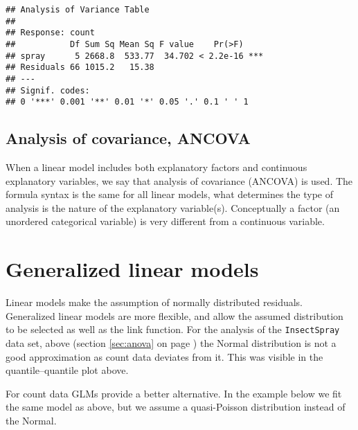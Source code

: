\documentclass[paper=a4,headsepline,BCOR=12mm,twoside,open=right,%
titlepage,headings=small,fontsize=10pt,index=totoc,bibliography=totoc,%
captions=tableheading,captions=nooneline]{scrbook}\usepackage{knitr}
\begin{document}
\begin{knitrout}\footnotesize
{}\color{fgcolor}\begin{kframe}
\begin{alltt}
\end{alltt}
\begin{verbatim}
## Analysis of Variance Table
## 
## Response: count
##           Df Sum Sq Mean Sq F value    Pr(>F)    
## spray      5 2668.8  533.77  34.702 < 2.2e-16 ***
## Residuals 66 1015.2   15.38                      
## ---
## Signif. codes:  
## 0 '***' 0.001 '**' 0.01 '*' 0.05 '.' 0.1 ' ' 1
\end{verbatim}
\end{kframe}
\end{knitrout}

\subsection{Analysis of covariance, ANCOVA}

When a linear model includes both explanatory factors and continuous explanatory variables, we say that analysis of covariance (ANCOVA) is used. The formula syntax is the same for all linear models, what determines the type of analysis is the nature of the explanatory variable(s). Conceptually a factor (an unordered categorical variable) is very different from a continuous variable.

\section{Generalized linear models}

Linear models make the assumption of normally distributed residuals. Generalized linear models are more flexible, and allow the assumed distribution to be selected as well as the link function.
For the analysis of the \texttt{InsectSpray} data set, above (section \ref{sec:anova} on page \pageref{sec:anova}) the Normal distribution is not a good approximation as count data deviates from it. This was visible in the quantile--quantile plot above.

For count data GLMs provide a better alternative. In the example below we fit the same model as above, but we assume a quasi-Poisson distribution instead of the Normal.
\end{document}
